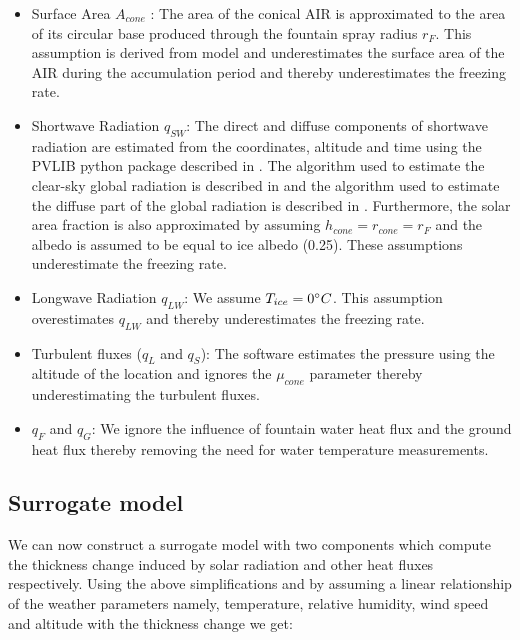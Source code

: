 \documentclass[utf8]{frontiersSCNS}
\begin{document}
\begin{itemize}

  \item Surface Area $A_{cone}$ : The area of the conical AIR is approximated to the area of its circular base
    produced through the fountain spray radius $r_F$. This assumption is derived from
    \cite{oerlemansBriefCommunicationGrowth2021} model and underestimates the surface area of the AIR during the
    accumulation period and thereby underestimates the freezing rate.

  \item Shortwave Radiation $q_{SW}$: The direct and diffuse components of shortwave radiation are estimated from the coordinates,
    altitude and time using the PVLIB python package described in \cite{holmgrenPvlibPythonPython2018} . The algorithm used to
    estimate the clear-sky global radiation is described in and the algorithm used to estimate the diffuse part
    of the global radiation is described in . Furthermore, the solar area fraction is also approximated by
    assuming $h_{cone} = r_{cone} = r_{F}$ and the albedo is assumed to be equal to ice albedo (0.25). These
    assumptions underestimate the freezing rate.

  \item Longwave Radiation $q_{LW}$: We assume $T_{ice} = 0 \degree C$. This assumption overestimates $q_{LW}$
    and thereby underestimates the freezing rate.

  \item Turbulent fluxes ($q_{L}$ and $q_{S}$): The software estimates the pressure using the altitude of the
    location and ignores the $\mu_{cone}$ parameter thereby underestimating the turbulent fluxes.

  \item $q_{F}$ and $q_{G}$: We ignore the influence of fountain water heat flux and the ground heat flux
    thereby removing the need for water temperature measurements.

\end{itemize}

\subsection{Surrogate model}

We can now construct a surrogate model with two components which compute the thickness change induced by solar
radiation and other heat fluxes respectively. Using the above simplifications and by assuming a linear
relationship of the weather parameters namely, temperature, relative humidity, wind speed and altitude with the
thickness change we get:
\end{document}
